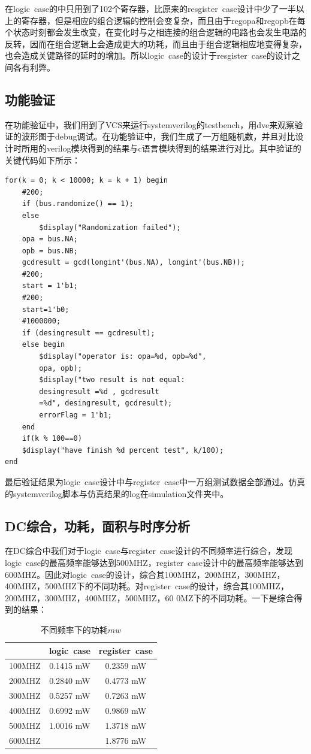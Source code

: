 \documentclass[12pt]{article}
\begin{document}
在logic~case的中只用到了102个寄存器，比原来的resgister~case设计中少了一半以上的寄存器，但是相应的组合逻辑的控制会变复杂，而且由于regopa和regopb在每个状态时刻都会发生改变，在变化时与之相连接的组合逻辑的电路也会发生电路的反转，因而在组合逻辑上会造成更大的功耗，而且由于组合逻辑相应地变得复杂，也会造成关键路径的延时的增加。所以logic~case的设计于resgister~case的设计之间各有利弊。

\subsection{功能验证}
在功能验证中，我们用到了VCS来运行systemverilog的testbench，用dve来观察验证的波形图于debug调试。在功能验证中，我们生成了一万组随机数，并且对比设计时所用的verilog模块得到的结果与c语言模块得到的结果进行对比。其中验证的关键代码如下所示：

\lstset{language=C}
\begin{lstlisting}
for(k = 0; k < 10000; k = k + 1) begin 
	#200;
	if (bus.randomize() == 1);
	else
		$display("Randomization failed");
	opa = bus.NA;
	opb = bus.NB;
	gcdresult = gcd(longint'(bus.NA), longint'(bus.NB));
    #200;
	start = 1'b1;
    #200;
    start=1'b0;
	#1000000;
	if (desingresult == gcdresult);
	else begin 
		$display("operator is: opa=%d, opb=%d", 
		opa, opb);
		$display("two result is not equal:
		desingresult =%d , gcdresult 
		=%d", desingresult, gcdresult);		
		errorFlag = 1'b1;
	end
    if(k % 100==0)
    $display("have finish %d percent test", k/100);		
end
\end{lstlisting}

最后验证结果为logic~case设计中与register~case中一万组测试数据全部通过。仿真的systemverilog脚本与仿真结果的log在simulation文件夹中。

\subsection{DC综合，功耗，面积与时序分析}
在DC综合中我们对于logic~case与register~case设计的不同频率进行综合，发现logic~case的最高频率能够达到500MHZ，register~case设计中的最高频率能够达到600MHZ。因此对logic~case的设计，综合其100MHZ，200MHZ，300MHZ，400MHZ，500MHZ下的不同功耗。对register~case的设计，综合其100MHZ，200MHZ，300MHZ，400MHZ，500MHZ，60
0MZ下的不同功耗。一下是综合得到的结果：


\begin{table}[H]
\centering
\begin{tabular}{ccc}
\hline 
& logic~case & register~case\\
\hline 
100MHZ & 0.1415 mW& 0.2359 mW\\
200MHZ & 0.2840 mW& 0.4773 mW\\
300MHZ & 0.5257 mW& 0.7263 mW\\
400MHZ & 0.6992 mW& 0.9869 mW\\
500MHZ & 1.0016 mW& 1.3718 mW\\
600MHZ &  & 1.8776 mW\\
\hline 
\end{tabular}
\caption{不同频率下的功耗$mw$}
\label{power_table}
\end{table}
\end{document}
